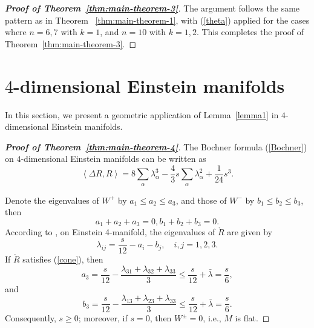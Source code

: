 \documentclass[11pt, reqno]{amsart}
\numberwithin{equation}{section}
\theoremstyle{definition}
\begin{document}
	\begin{proof}[\textbf{Proof of Theorem~\ref{thm:main-theorem-3}}]
		The argument follows the same pattern as in Theorem ~\ref{thm:main-theorem-1}, with (\ref{theta}) applied for the cases where $n=6,7$ with $k=1$, and $n=10$ with $k=1,2$. This completes the proof of Theorem~\ref{thm:main-theorem-3}.
	\end{proof}
	
	\section{$4$-dimensional Einstein manifolds}
	In this section, we present a geometric application of Lemma~\ref{lemma1} in $4$-dimensional Einstein manifolds.
	
	\begin{proof}[\textbf{Proof of Theorem~\ref{thm:main-theorem-4}}]
		The  Bochner formula (\ref{Bochner}) on $4$-dimensional Einstein manifolds can be written as
\begin{equation}\label{Bochner2}
		\left\langle \Delta R,R \right\rangle =8\sum\limits_{\alpha }{\lambda _{\alpha }^{3}}-\frac{4}{3}s\sum\limits_{\alpha }{\lambda _{\alpha}^2}+\frac{1}{24}s^3 .	\end{equation}
		
		Denote the eigenvalues of $W^+$ by $a_{1} \le a_{2} \le a_{3}$, and those of $W^-$ by $b_{1} \le b_{2} \le b_{3}$, then
\begin{equation}\label{Weyl}
a_{1}+a_{2}+ a_{3}=0, b_{1}+b_{2}+b_{3}=0.
\end{equation}		
		According to \cite{CGT}, on Einstein 4-manifold, the eigenvalues of $\mathring{R}$ are given by
		\begin{equation}\label{RW}
			{\lambda}_{ij}=\frac{s}{12}-a_i-b_j,\quad i,j=1,2,3.
		\end{equation}		
		If  $\mathring{R}$ satisfies (\ref{cone}), then
		\[a_3=\frac{s}{12}-\frac{\lambda_{31}+\lambda_{32}+\lambda_{33}}{3}\le \frac{s}{12}+\bar{\lambda}=\frac{s}{6},\]
		and \[b_3=\frac{s}{12}-\frac{\lambda_{13}+\lambda_{23}+\lambda_{33}}{3}\le \frac{s}{12}+\bar{\lambda}=\frac{s}{6}.\]
		Consequently, $s\ge0$;  moreover,  if $s=0$, then $W^{\pm}=0$, i.e., $M$ is flat. 
		

\end{proof}
\end{document}
